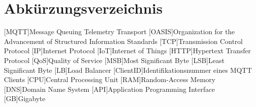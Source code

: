 

\section*{Abkürzungsverzeichnis}
\begin{acronym}[xxxxxxxxxx] %
    [MQTT]{Message Queuing Telemetry Transport}
    [OASIS]{Organization for the Advancement of Structured Information Standards}
    [TCP]{Transmission Control Protocol}
    [IP]{Internet Protocol}
    [IoT]{Internet of Things}
    [HTTP]{Hypertext Transfer Protocol}
    [QoS]{Quality of Service}
    [MSB]{Most Significant Byte}
    [LSB]{Least Significant Byte}
    [LB]{Load Balancer}
    [ClientID]{Identifikationsnummer eines MQTT Clients}
    [CPU]{Central Processing Unit}
    [RAM]{Random-Access Memory}
    [DNS]{Domain Name System}
    [API]{Application Programming Interface}
    [GB]{Gigabyte}
\end{acronym}
